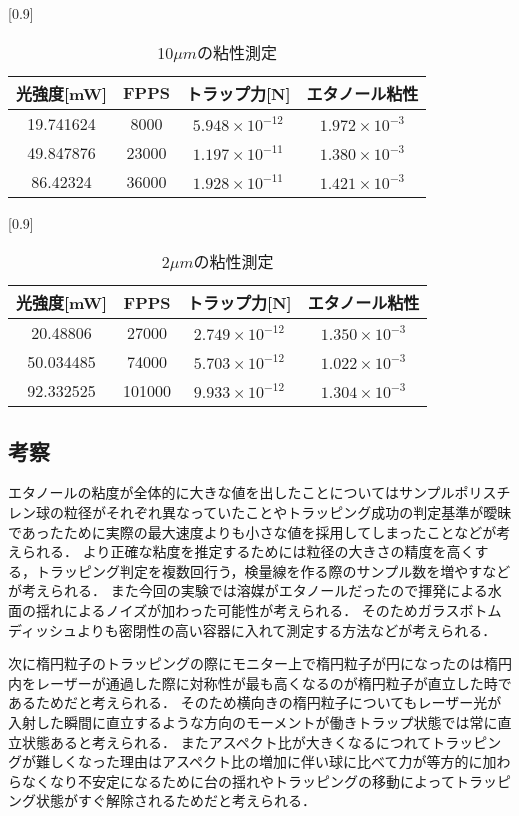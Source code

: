 \documentclass[11pt, a4paper,twocolumn]{jarticle}
\begin{document}
\begin{table}[htbp]
    \begin{center}
        \scalebox{0.8}[0.9]{ %
        \begin{tabular}{cccc}
            光強度[mW] & FPPS & トラップ力[N] & エタノール粘性 \\ \hline
            19.741624  & 8000 & $5.948\times 10^{-12}$  & $1.972\times 10^{-3}$  \\
            49.847876 & 23000 & $1.197\times 10^{-11}$  & $1.380\times 10^{-3}$ \\
            86.42324 & 36000 & $1.928\times 10^{-11}$  & $1.421\times 10^{-3}$
        \end{tabular}
        }
        \caption{10$\mu m$の粘性測定}
        \label{table:6}
    \end{center}
\end{table}

\begin{table}[htbp]
    \begin{center}
        \scalebox{0.8}[0.9]{ %
        \begin{tabular}{cccc}
            光強度[mW] & FPPS & トラップ力[N] & エタノール粘性 \\ \hline
            20.48806  & 27000 & $2.749\times 10^{-12}$  & $1.350\times 10^{-3}$  \\
            50.034485 & 74000 & $5.703\times 10^{-12}$  & $1.022\times 10^{-3}$ \\
            92.332525 & 101000 & $9.933\times 10^{-12}$  & $1.304\times 10^{-3}$
        \end{tabular}
        }
        \caption{2$\mu m$の粘性測定}
        \label{table:7}
    \end{center}
\end{table}

\subsection{考察}
エタノールの粘度が全体的に大きな値を出したことについてはサンプルポリスチレン球の粒径がそれぞれ異なっていたことやトラッピング成功の判定基準が曖昧であったために実際の最大速度よりも小さな値を採用してしまったことなどが考えられる．
より正確な粘度を推定するためには粒径の大きさの精度を高くする，トラッピング判定を複数回行う，検量線を作る際のサンプル数を増やすなどが考えられる．
また今回の実験では溶媒がエタノールだったので揮発による水面の揺れによるノイズが加わった可能性が考えられる．
そのためガラスボトムディッシュよりも密閉性の高い容器に入れて測定する方法などが考えられる．

次に楕円粒子のトラッピングの際にモニター上で楕円粒子が円になったのは楕円内をレーザーが通過した際に対称性が最も高くなるのが楕円粒子が直立した時であるためだと考えられる．
そのため横向きの楕円粒子についてもレーザー光が入射した瞬間に直立するような方向のモーメントが働きトラップ状態では常に直立状態あると考えられる．
またアスペクト比が大きくなるにつれてトラッピングが難しくなった理由はアスペクト比の増加に伴い球に比べて力が等方的に加わらなくなり不安定になるために台の揺れやトラッピングの移動によってトラッピング状態がすぐ解除されるためだと考えられる．

\newpage
\end{document}
